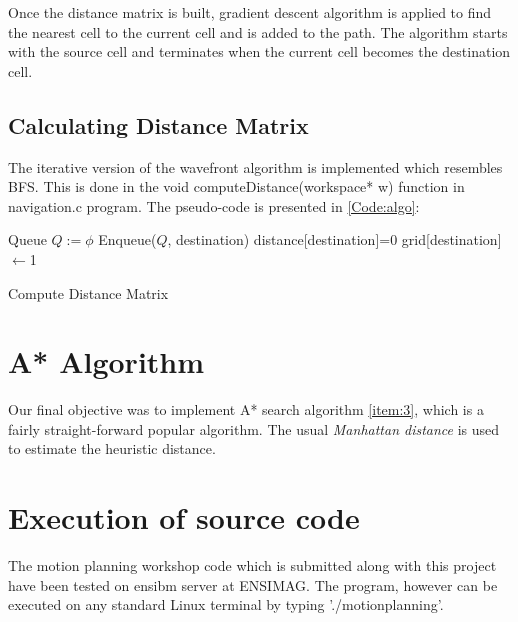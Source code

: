 \documentclass[12pt]{article}
\begin{document}
Once the distance matrix is built, gradient descent
  algorithm is applied to find the nearest cell to the current cell
  and is added to the path. The algorithm starts with the source cell and terminates when the current cell becomes the destination cell. 

\subsection{Calculating Distance Matrix}

 The iterative version of the wavefront algorithm is implemented
 which resembles BFS. This is done in the \textsf{void
   computeDistance(workspace* w)} function in \textsf{navigation.c}
 program. The pseudo-code is presented in \autoref{Code:algo}: \\


\linesnumbered
\begin{algorithm}[H]
 \SetVline
 Queue $Q:=\phi$\;
 Enqueue($Q$, destination)\;
 distance[destination]=$0$\;
 grid[destination]$\leftarrow$1\;
 \caption{Compute Distance Matrix \label{Code:algo}}
\end{algorithm}



\section{A* Algorithm}
	Our final objective was to implement A* search algorithm
  \ref{item:3}, which is a fairly straight-forward popular
  algorithm. The usual \textit{Manhattan distance} is used to estimate
  the heuristic distance.
	
\section{Execution of source code}

	The motion planning workshop code which is submitted along with this
  project have been tested on \textsf{ensibm} server at ENSIMAG. The
  program, however can be executed on any standard Linux terminal by
  typing \textsf{'./motionplanning'}. 
\end{document}
